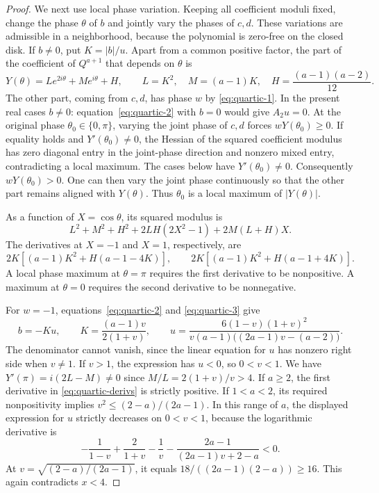 \documentclass[11pt]{article}
\begin{document}
\begin{proof}
We next use local phase variation. Keeping all coefficient moduli
fixed, change the phase \(\theta\) of \(b\) and jointly vary the phases
of \(c,d\). These variations are admissible in a neighborhood,
because the polynomial is zero-free on the closed disk.
If \(b\ne0\), put \(K=|b|/u\). Apart from a common positive factor, the
part of the coefficient of \(Q^{a+1}\) that depends on \(\theta\)
is
\[
 Y(\theta)=L e^{2i\theta}+M e^{i\theta}+H,\qquad
 L=K^2,\quad M=(a-1)K,\quad H=\frac{(a-1)(a-2)}{12}.
\]
The other part, coming from \(c,d\), has phase \(w\) by
\eqref{eq:quartic-1}. In the present real cases \(b\ne0\):
equation~\eqref{eq:quartic-2} with \(b=0\) would give \(A_2u=0\).
At the original phase \(\theta_0\in\{0,\pi\}\), varying the joint
phase of \(c,d\) forces \(wY(\theta_0)\ge0\). If equality holds and
\(Y'(\theta_0)\ne0\), the Hessian of the squared coefficient modulus
has zero diagonal entry in the joint-phase direction and nonzero
mixed entry, contradicting a local maximum. The cases below have
\(Y'(\theta_0)\ne0\). Consequently \(wY(\theta_0)>0\).
One can then vary the joint phase continuously so that the other
part remains aligned with \(Y(\theta)\). Thus \(\theta_0\) is a
local maximum of \(|Y(\theta)|\).

As a function of \(X=\cos\theta\), its squared modulus is
\[
 L^2+M^2+H^2+2LH(2X^2-1)+2M(L+H)X .
\]
The derivatives at \(X=-1\) and \(X=1\), respectively, are
\[
 2K[(a-1)K^2+H(a-1-4K)],\qquad
 2K[(a-1)K^2+H(a-1+4K)].
 \tag{\(\dagger\)}\label{eq:quartic-derivs}
\]
A local phase maximum at \(\theta=\pi\) requires the first derivative
to be nonpositive. A maximum at \(\theta=0\) requires the second
derivative to be nonnegative.

For \(w=-1\), equations~\eqref{eq:quartic-2} and
\eqref{eq:quartic-3} give
\[
 b=-Ku,\qquad K=\frac{(a-1)v}{2(1+v)},\qquad
 u=\frac{6(1-v)(1+v)^2}
         {v(a-1)\bigl((2a-1)v-(a-2)\bigr)} .
\]
The denominator cannot vanish, since the linear equation for \(u\)
has nonzero right side when \(v\ne1\). If \(v>1\), the expression has
\(u<0\), so \(0<v<1\).
We have \(Y'(\pi)=i(2L-M)\ne0\) since \(M/L=2(1+v)/v>4\).
If \(a\ge2\), the first derivative in \eqref{eq:quartic-derivs} is
strictly positive. If \(1<a<2\), its required nonpositivity implies
\(v^2\le(2-a)/(2a-1)\). In this range of \(a\), the displayed
expression for \(u\) strictly decreases on \(0<v<1\), because the
logarithmic derivative is
\[
 -\frac1{1-v}+\frac2{1+v}-\frac1v-
       \frac{2a-1}{(2a-1)v+2-a}<0 .
\]
At \(v=\sqrt{(2-a)/(2a-1)}\), it equals
\(18/((2a-1)(2-a))\ge16\). This again contradicts \(x<4\).


\end{proof}
\end{document}
